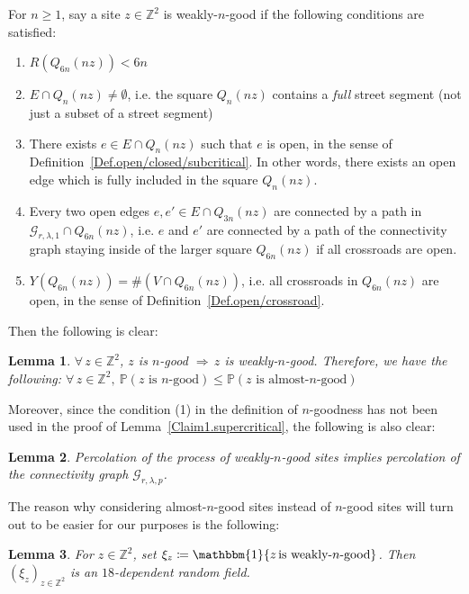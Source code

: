 \documentclass[10pt,a4paper]{amsart}
\theoremstyle{exampstyle}
\newtheorem{Lemma}{Lemma}
\theoremstyle{exampnotations}
\begin{document}
For $n \geq 1$, say a site $z \in \mathbb{Z}^{2}$ is weakly-$n$-good if the following conditions are satisfied:
\begin{enumerate}
\item[(1\textsuperscript{'})] $R(Q_{6n}(nz)) < 6n$
\item[(2)]  $E \cap Q_n(nz) \neq \emptyset$, i.e. the square $Q_n(nz)$ contains a \emph{full} street segment (not just a subset of a street segment)
\item[(3)]  There exists $e \in E \cap Q_n(nz)$ such that $e$ is open, in the sense of Definition~\ref{Def.open/closed/subcritical}. In other words, there exists an open edge which is fully included in the square $Q_n(nz)$.
\item[(4)]  Every two open edges $e,e' \in E \cap Q_{3n}(nz)$ are connected by a path in $\mathcal{G}_{r,\lambda,1}\cap Q_{6n}(nz)$, i.e. $e$ and $e'$ are connected by a path of the connectivity graph staying inside of the larger square $Q_{6n}(nz)$ if all crossroads are open.
\item[(5)]  $Y(Q_{6n}(nz)) = \#(V \cap Q_{6n}(nz))$, i.e. all crossroads in $Q_{6n}(nz)$ are open, in the sense of Definition~\ref{Def.open/crossroad}.
\end{enumerate}
Then the following is clear:
\begin{Lemma}
\label{Lemma1.almost}
$\forall \, z \in \mathbb{Z}^{2}$, $z$ is $n$-good $\Rightarrow \, z$ is weakly-$n$-good. Therefore, we have the following: $\forall \, z \in \mathbb{Z}^{2}, \: \mathbb{P}(\text{$z$ is $n$-good}) \leq \mathbb{P}(\text{$z$ is almost-$n$-good})$
\end{Lemma} Moreover, since the condition (1) in the definition of $n$-goodness has not been used in the proof of Lemma~\ref{Claim1.supercritical}, the following is also clear:
\begin{Lemma}
\label{Lemma2.almost}
Percolation of the process of weakly-$n$-good sites implies percolation of the connectivity graph $\mathcal{G}_{r,\lambda,p}$.
\end{Lemma}
The reason why considering almost-$n$-good sites instead of $n$-good sites will turn out to be easier for our purposes is the following:
\begin{Lemma}
\label{Claim2.supercritical}
For $z \in \mathbb{Z}^{2}$, set $\xi_{z} \coloneqq \mathbbm{1}\lbrace z \, \text{is weakly-$n$-good} \rbrace$. Then $(\xi_{z})_{z \in \mathbb{Z}^{2}}$ is an $18$-dependent random field.
\end{Lemma}
\end{document}
